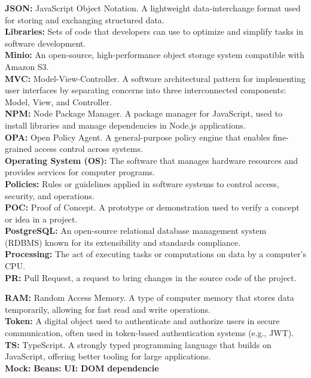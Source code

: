 \textbf{JSON:} JavaScript Object Notation. A lightweight data-interchange format used for storing and exchanging structured data.\\

\textbf{Libraries:} Sets of code that developers can use to optimize and simplify tasks in software development.\\

\textbf{Minio:} An open-source, high-performance object storage system compatible with Amazon S3.\\

\textbf{MVC:} Model-View-Controller. A software architectural pattern for implementing user interfaces by separating concerns into three interconnected components: Model, View, and Controller.\\

\textbf{NPM:} Node Package Manager. A package manager for JavaScript, used to install libraries and manage dependencies in Node.js applications.\\

\textbf{OPA:} Open Policy Agent. A general-purpose policy engine that enables fine-grained access control across systems.\\

\textbf{Operating System (OS):} The software that manages hardware resources and provides services for computer programs.\\

\textbf{Policies:} Rules or guidelines applied in software systems to control access, security, and operations.\\

\textbf{POC:} Proof of Concept. A prototype or demonstration used to verify a concept or idea in a project.\\

\textbf{PostgreSQL:} An open-source relational database management system (RDBMS) known for its extensibility and standards compliance.\\

\textbf{Processing:} The act of executing tasks or computations on data by a computer's CPU.\\

\textbf{PR:} Pull Request, a request to bring changes in the source code of the project.

\textbf{RAM:} Random Access Memory. A type of computer memory that stores data temporarily, allowing for fast read and write operations.\\

\textbf{Token:} A digital object used to authenticate and authorize users in secure communication, often used in token-based authentication systems (e.g., JWT).\\

\textbf{TS:} TypeScript. A strongly typed programming language that builds on JavaScript, offering better tooling for large applications.\\

\textbf{Mock:}
\textbf{Beans:}
\textbf{UI:}
\textbf{DOM}
\textbf{dependencie}